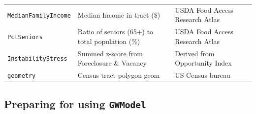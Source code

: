 \documentclass[
]{book}
\newcommand{\passthrough}[1]{#1}
\begin{document}
\begin{longtable}[]{@{}lll@{}}
\begin{minipage}[t]{0.19\columnwidth}
\passthrough{\lstinline!MedianFamilyIncome!}\strut
\end{minipage} & \begin{minipage}[t]{0.29\columnwidth}\raggedright
Median Income in tract (\$)\strut
\end{minipage} & \begin{minipage}[t]{0.43\columnwidth}\raggedright
USDA Food Access Research Atlas\strut
\end{minipage}\tabularnewline
\begin{minipage}[t]{0.19\columnwidth}\raggedright
\passthrough{\lstinline!PctSeniors!}\strut
\end{minipage} & \begin{minipage}[t]{0.29\columnwidth}\raggedright
Ratio of seniors (65+) to total population (\%)\strut
\end{minipage} & \begin{minipage}[t]{0.43\columnwidth}\raggedright
USDA Food Access Research Atlas\strut
\end{minipage}\tabularnewline
\begin{minipage}[t]{0.19\columnwidth}\raggedright
\passthrough{\lstinline!InstabilityStress!}\strut
\end{minipage} & \begin{minipage}[t]{0.29\columnwidth}\raggedright
Summed z-score from Foreclosure \& Vacancy\strut
\end{minipage} & \begin{minipage}[t]{0.43\columnwidth}\raggedright
Derived from Opportunity Index\strut
\end{minipage}\tabularnewline
\begin{minipage}[t]{0.19\columnwidth}\raggedright
\passthrough{\lstinline!geometry!}\strut
\end{minipage} & \begin{minipage}[t]{0.29\columnwidth}\raggedright
Census tract polygon geom\strut
\end{minipage} & \begin{minipage}[t]{0.43\columnwidth}\raggedright
US Census bureau\strut
\end{minipage}\tabularnewline
\bottomrule
\end{longtable}

\hypertarget{preparing-for-using-gwmodel}{%
\subsection{\texorpdfstring{Preparing for using \texttt{GWModel}}{Preparing for using GWModel}}\label{preparing-for-using-gwmodel}}
\end{document}
